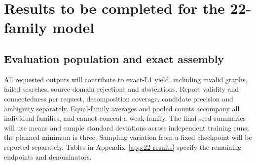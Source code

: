 \section{Results to be completed for the 22-family model}
\label{sec:results}
\TwentyTwoScope

\subsection{Evaluation population and exact assembly}
All requested outputs will contribute to exact-L1 yield, including invalid graphs, failed searches,
source-domain rejections and abstentions. Report validity and connectedness per request, decomposition coverage,
candidate precision and ambiguity separately. Equal-family averages and pooled counts accompany
all individual families, and cannot conceal a weak family. The final seed summaries will use means
and sample standard deviations across independent training runs; the planned minimum is three.
Sampling variation from a fixed checkpoint will be reported separately. Tables in
Appendix~\ref{app:22-results} specify the remaining endpoints and denominators.
